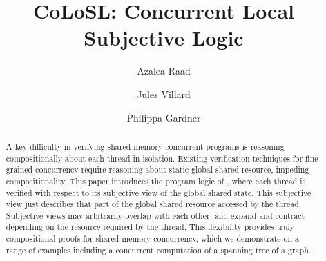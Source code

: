 \documentclass[runningheads,a4paper]{llncs}
\begin{document}
%
\title{CoLoSL: Concurrent Local Subjective Logic}
\author{Azalea Raad\and Jules Villard\and Philippa Gardner}

\maketitle

\begin{abstract}
A key difficulty in verifying shared-memory concurrent programs is
reasoning compositionally about each thread in isolation. Existing
verification techniques for fine-grained concurrency require 
reasoning about static global shared resource, impeding compositionality.  This
paper introduces the program logic of \colosl, where each thread is
verified with respect to its subjective view of the global
shared state.
This subjective view  just describes  that part of the global shared resource accessed by the
thread. Subjective views may arbitrarily overlap with each other, and
expand and contract depending on the resource required by the thread.
This flexibility provides truly compositional proofs for shared-memory
concurrency, which we demonstrate on a range of examples including a
concurrent computation of a spanning tree of a graph.
\end{abstract}

\allowdisplaybreaks
%
%

%
%
%
%


\appendix{

}
%
\end{document}
